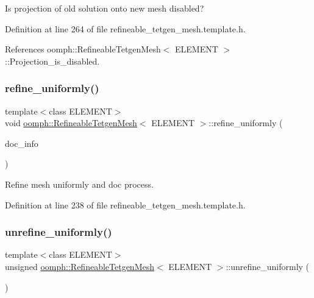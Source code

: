 Is projection of old solution onto new mesh disabled? 



Definition at line 264 of file refineable\+\_\+tetgen\+\_\+mesh.\+template.\+h.



References oomph\+::\+Refineable\+Tetgen\+Mesh$<$ E\+L\+E\+M\+E\+N\+T $>$\+::\+Projection\+\_\+is\+\_\+disabled.

\mbox{\label{classoomph_1_1RefineableTetgenMesh_a5ddc94b2545c82bfb2795583f9b98db2}} 
\subsubsection{\texorpdfstring{refine\+\_\+uniformly()}{refine\_uniformly()}}
{\footnotesize\ttfamily template$<$class E\+L\+E\+M\+E\+NT$>$ \\
void \hyperlink{classoomph_1_1RefineableTetgenMesh}{oomph\+::\+Refineable\+Tetgen\+Mesh}$<$ E\+L\+E\+M\+E\+NT $>$\+::refine\+\_\+uniformly (\begin{DoxyParamCaption}\item[{Doc\+Info \&}]{doc\+\_\+info }\end{DoxyParamCaption})\hspace{0.3cm}{\ttfamily [inline]}}



Refine mesh uniformly and doc process. 



Definition at line 238 of file refineable\+\_\+tetgen\+\_\+mesh.\+template.\+h.

\mbox{\label{classoomph_1_1RefineableTetgenMesh_add609c3184ffa1786e183f4c6dc24a57}} 
\subsubsection{\texorpdfstring{unrefine\+\_\+uniformly()}{unrefine\_uniformly()}}
{\footnotesize\ttfamily template$<$class E\+L\+E\+M\+E\+NT$>$ \\
unsigned \hyperlink{classoomph_1_1RefineableTetgenMesh}{oomph\+::\+Refineable\+Tetgen\+Mesh}$<$ E\+L\+E\+M\+E\+NT $>$\+::unrefine\+\_\+uniformly (\begin{DoxyParamCaption}{ }\end{DoxyParamCaption})\hspace{0.3cm}{\ttfamily [inline]}}



